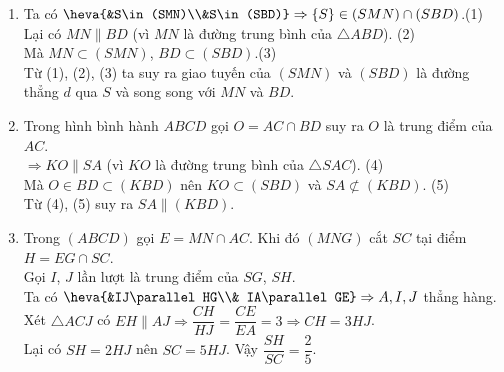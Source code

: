 \begin{bt}
{\begin{center}
	\end{center}
	\begin{enumerate}
		\item Ta có $\heva{&S\in(SMN)\\&S\in(SBD)}
			\Rightarrow \{S\}\in (SMN) \cap (SBD)$.\hfill (1)
		\\
		Lại có $MN\parallel BD$ (vì $MN$ là đường trung bình của $\triangle ABD$). \hfill (2)
		\\
		Mà $MN \subset (SMN)$, $BD\subset (SBD)$.\hfill (3)
		\\
		Từ (1), (2), (3) ta suy ra giao tuyến của $(SMN)$ và $(SBD)$ là đường thẳng $d$ qua $S$ và song song với $MN$ và $BD$.
		\item Trong hình bình hành $ABCD$ gọi $O=AC \cap BD$ suy ra $O$ là trung điểm của $AC$.
		\\
		$\Rightarrow KO \parallel SA$ (vì $KO$ là đường trung bình của $\triangle SAC$). \hfill (4)
		\\
		Mà $O\in BD \subset (KBD)$ nên $KO\subset (SBD)$ và $SA\not\subset (KBD)$.  \hfill (5)
		\\
		Từ (4), (5) suy ra $SA \parallel (KBD)$.
		\item Trong $(ABCD)$ gọi $E=MN\cap AC$. Khi đó $(MNG)$ cắt $SC$ tại điểm $H=EG\cap SC$.
		\\
		Gọi $I$, $J$ lần lượt là trung điểm của $SG$, $SH$.
		\\
		Ta có $\heva{&IJ\parallel HG\\& IA\parallel GE}\Rightarrow A,I,J$ thẳng hàng.
		\\
		Xét $\triangle ACJ$ có $EH\parallel AJ \Rightarrow \dfrac{CH}{HJ}=\dfrac{CE}{EA}=3 \Rightarrow CH=3HJ$.
		\\
		Lại có $SH=2HJ$ nên $SC=5HJ$. Vậy $\dfrac{SH}{SC}=\dfrac{2}{5}$.
	\end{enumerate}
	}
\end{bt}

